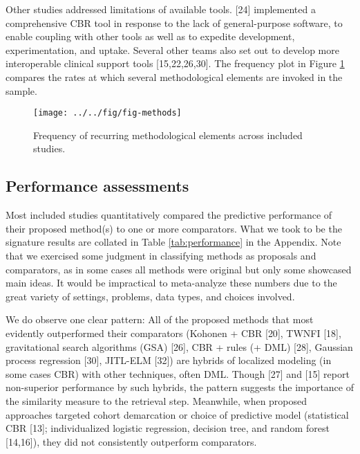 \documentclass[preprint, 3p,
authoryear]{elsarticle} %
\begin{document}
Other studies addressed limitations of available tools. {[}24{]}
implemented a comprehensive CBR tool in response to the lack of
general-purpose software, to enable coupling with other tools as well as
to expedite development, experimentation, and uptake. Several other
teams also set out to develop more interoperable clinical support tools
{[}15,22,26,30{]}. The frequency plot in Figure \ref{fig:methods}
compares the rates at which several methodological elements are invoked
in the sample.

\begin{figure}

{\centering \texttt{[image: ../../fig/fig-methods]} 

}

\caption{Frequency of recurring methodological elements across included studies.}\label{fig:methods}
\end{figure}

\hypertarget{performance-assessments}{%
\subsection{Performance assessments}\label{performance-assessments}}

\label{performance-assessments}

Most included studies quantitatively compared the predictive performance
of their proposed method(s) to one or more comparators. What we took to
be the signature results are collated in Table \ref{tab:performance} in
the Appendix. Note that we exercised some judgment in classifying
methods as proposals and comparators, as in some cases all methods were
original but only some showcased main ideas. It would be impractical to
meta-analyze these numbers due to the great variety of settings,
problems, data types, and choices involved.

We do observe one clear pattern: All of the proposed methods that most
evidently outperformed their comparators (Kohonen + CBR {[}20{]}, TWNFI
{[}18{]}, gravitational search algorithms (GSA) {[}26{]}, CBR + rules (+
DML) {[}28{]}, Gaussian process regression {[}30{]}, JITL-ELM {[}32{]})
are hybrids of localized modeling (in some cases CBR) with other
techniques, often DML. Though {[}27{]} and {[}15{]} report non-superior
performance by such hybrids, the pattern suggests the importance of the
similarity measure to the retrieval step. Meanwhile, when proposed
approaches targeted cohort demarcation or choice of predictive model
(statistical CBR {[}13{]}; individualized logistic regression, decision
tree, and random forest {[}14,16{]}), they did not consistently
outperform comparators.
\end{document}
